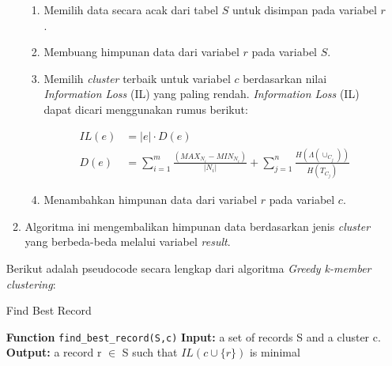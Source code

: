 \documentclass[a4paper,twoside]{article}
\begin{document}
\begin{enumerate}
\begin{enumerate}
\begin{enumerate}
\item Memilih data secara acak dari tabel $S$ untuk disimpan pada variabel $r$.

\item Membuang himpunan data dari variabel $r$ pada variabel $S$.

\item Memilih \textit{cluster} terbaik untuk variabel $c$ berdasarkan nilai \textit{Information Loss} (IL) yang paling rendah. \textit{Information Loss} (IL) dapat dicari menggunakan rumus berikut:

\begin{align*}
IL(e)&= |e| \cdot D(e) \\
D(e) &= \sum_{i=1}^{m} \frac{(MAX_{N_i} - MIN_{N_i})}{|N_i|} + \sum_{j=1}^{n}\frac{H(\Lambda(\cup_{C_j}))}{H(T_{C_j})}
\end{align*}

\item Menambahkan himpunan data dari variabel $r$ pada variabel $c$.

\end{enumerate}

\item Algoritma ini mengembalikan himpunan data berdasarkan jenis \textit{cluster} yang berbeda-beda melalui variabel \textit{result}.

\end{enumerate}

\noindent Berikut adalah pseudocode secara lengkap dari algoritma \textit{Greedy k-member clustering}:
\begin{tcolorbox}[blanker,width=(\linewidth-0.5cm)]
\begin{algorithm}[H]
  \caption{Find Best Record}\label{alg:1}
  \begin{algorithmic}[1]
  \State \textbf{Function} \texttt{find\_best\_record(S,c)}
  \State \textbf{Input:} a set of records S and a cluster c.
  \State \textbf{Output:} a record r $\in$ S such that $IL(c \cup \{r\})$ is minimal
  \\
  \EndIf
  \EndFor
  \end{algorithmic}
\end{algorithm}
\end{tcolorbox}


\end{enumerate}
\end{document}
